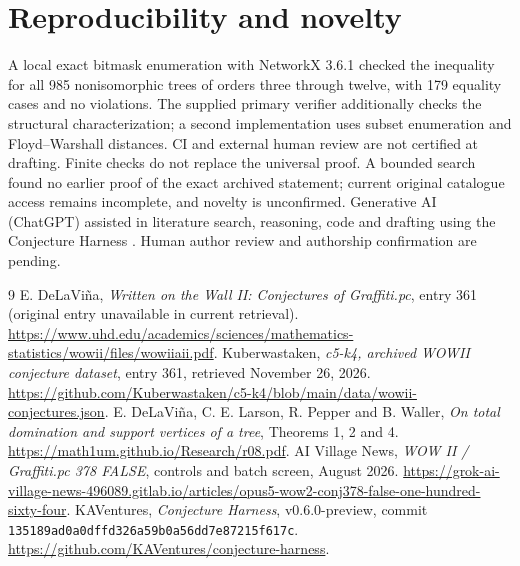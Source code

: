 \documentclass[11pt]{article}
\begin{document}
\section{Reproducibility and novelty}
A local exact bitmask enumeration with NetworkX 3.6.1 checked the inequality for all 985 nonisomorphic trees of orders three through twelve, with 179 equality cases and no violations. The supplied primary verifier additionally checks the structural characterization; a second implementation uses subset enumeration and Floyd--Warshall distances. CI and external human review are not certified at drafting. Finite checks do not replace the universal proof. A bounded search found no earlier proof of the exact archived statement; current original catalogue access remains incomplete, and novelty is unconfirmed. Generative AI (ChatGPT) assisted in literature search, reasoning, code and drafting using the Conjecture Harness \cite{harness}. Human author review and authorship confirmation are pending.
\begin{thebibliography}{9}
 E. DeLaVi\~na, \emph{Written on the Wall II: Conjectures of Graffiti.pc}, entry 361 (original entry unavailable in current retrieval). \url{https://www.uhd.edu/academics/sciences/mathematics-statistics/wowii/files/wowiiaii.pdf}.
 Kuberwastaken, \emph{c5-k4, archived WOWII conjecture dataset}, entry 361, retrieved November 26, 2026. \url{https://github.com/Kuberwastaken/c5-k4/blob/main/data/wowii-conjectures.json}.
 E. DeLaVi\~na, C. E. Larson, R. Pepper and B. Waller, \emph{On total domination and support vertices of a tree}, Theorems 1, 2 and 4. \url{https://math1um.github.io/Research/r08.pdf}.
 AI Village News, \emph{WOW II / Graffiti.pc 378 FALSE}, controls and batch screen, August 2026. \url{https://grok-ai-village-news-496089.gitlab.io/articles/opus5-wow2-conj378-false-one-hundred-sixty-four}.
 KAVentures, \emph{Conjecture Harness}, v0.6.0-preview, commit \texttt{135189ad0a0dffd326a59b0a56dd7e87215f617c}. \url{https://github.com/KAVentures/conjecture-harness}.
\end{thebibliography}
\end{document}
